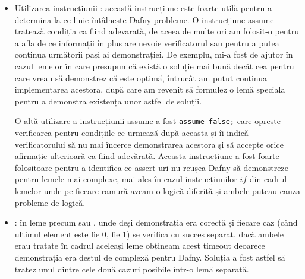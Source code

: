 \begin{sloppypar}
\begin{itemize}
    \hspace{2mm} De asemenea, folosind structura \texttt{assert ... by} putem reduce sarcina verificatorului deoarece pașii din acest bloc de instrucțiuni sunt "uitați" după verificarea condiției din assert:
    \begin{Verbatim}[commandchars=\\\{\}]
\PY{k}{assert} \PY{n}{gain}\PY{p}{(}\PY{n}{p}\PY{p}{,} \PY{n}{x}\PY{p}{[}\PY{p}{..}\PY{n}{i} \PY{o}{\PYZhy{}} \PY{l+m+mi}{1}\PY{p}{]}\PY{p}{)} \PY{o}{==} \PY{n}{gain}\PY{p}{(}\PY{n}{p}\PY{p}{,} \PY{n}{solution1}\PY{p}{)} \PY{n}{by}
\PY{p}{\PYZob{}}
  \PY{n}{optimalSolRemove1}\PY{p}{(}\PY{n}{p}\PY{p}{,} \PY{n}{x}\PY{p}{,} \PY{n}{i}\PY{p}{,} \PY{n}{j}\PY{p}{)}\PY{p}{;}
  \PY{k}{assert} \PY{n}{isOptimalPartialSolution}\PY{p}{(}\PY{n}{p}\PY{p}{,} \PY{n}{x}\PY{p}{[}\PY{p}{..}\PY{n}{i} \PY{o}{\PYZhy{}} \PY{l+m+mi}{1}\PY{p}{]}\PY{p}{,} 
    \PY{n}{i} \PY{o}{\PYZhy{}} \PY{l+m+mi}{1}\PY{p}{,} \PY{n}{j} \PY{o}{\PYZhy{}} \PY{n}{p}\PY{p}{.}\PY{n}{weights}\PY{p}{[}\PY{n}{i} \PY{o}{\PYZhy{}} \PY{l+m+mi}{1}\PY{p}{]}\PY{p}{)}\PY{p}{;}
\PY{p}{\PYZcb{}} 
\end{Verbatim}
    \item Utilizarea instrucțiunii : această instrucțiune este foarte utilă pentru a determina la ce linie întâlnește Dafny probleme. O instrucțiune assume tratează condiția ca fiind adevarată, de aceea de multe ori am folosit-o pentru a afla de ce informații în plus are nevoie verificatorul sau pentru a putea continua următorii pași ai demonstrației. De exemplu, mi-a fost de ajutor în cazul lemelor în care presupun că există o soluție mai bună decât cea pentru care vreau să demonstrez că este optimă, întrucât am putut continua implementarea acestora, după care am revenit să formulez o lemă specială pentru a demonstra existența unor astfel de soluții. \par
    \hspace{2mm} O altă utilizare a instrucțiunii assume a fost \texttt{assume false;} care oprește verificarea pentru condițiile ce urmează după aceasta și îi indică verificatorului să nu mai încerce demonstrarea acestora și să accepte orice afirmație ulterioară ca fiind adevărată. Aceasta instrucțiune a fost foarte folositoare pentru a identifica ce assert-uri nu reușea Dafny să demonstreze pentru lemele mai complexe, mai ales în cazul instrucțiunilor $if$ din cadrul lemelor unde pe fiecare ramură aveam o logică diferită și ambele puteau cauza probleme de logică.
    \item {}: în leme precum  sau , unde deși demonstrația era corectă și fiecare caz (când ultimul element este fie 0, fie 1) se verifica cu succes separat, dacă ambele erau tratate în cadrul aceleași leme obțineam acest timeout deoarece demonstrația era destul de complexă pentru Dafny. Soluția a fost astfel să tratez unul dintre cele două cazuri posibile într-o lemă separată.
\end{itemize}

\end{sloppypar}